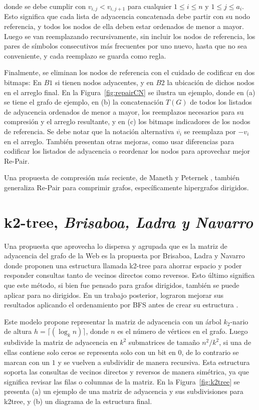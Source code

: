 \noindent donde se debe cumplir con $v_{i,j} < v_{i, j+1}$ para cualquier $1 \leq i \leq n$ y $1 \leq j \leq a_{i}$. Esto significa que cada lista de adyacencia concatenada debe partir con su nodo referencia, y todos los nodos de ella deben estar ordenados de menor a mayor. Luego se van reemplazando recursivamente, sin incluir los nodos de referencia, los pares de símbolos consecutivos más frecuentes por uno nuevo, hasta que no sea conveniente, y cada reemplazo se guarda como regla. 

Finalmente, se eliminan los nodos de referencia con el cuidado de codificar en dos bitmaps: En $B1$ si tienen nodos adyacentes, y en $B2$ la ubicación de dichos nodos en el arreglo final. En la Figura~\ref{fig:repairCN} se ilustra un ejemplo, donde en (a) se tiene el grafo de ejemplo, en (b) la concatenación $T(G)$ de todos los listados de adyacencia ordenados de menor a mayor, los reemplazos necesarios para su compresión y el arreglo resultante, y en (c) los bitmaps indicadores de los nodos de referencia. Se debe notar que la notación alternativa $\overline{v_{i}}$ se reemplaza por $-v_{i}$ en el arreglo. También presentan otras mejoras, como usar diferencias para codificar los listados de adyacencia o reordenar los nodos para aprovechar mejor Re-Pair.



Una propuesta de compresión más reciente, de Maneth y Peternek \cite{maneth2016compressing}, también generaliza Re-Pair para comprimir grafos, específicamente hipergrafos dirigidos.



\section{k2-tree, \textit{Brisaboa, Ladra y Navarro}}
Una propuesta que aprovecha lo dispersa y agrupada que es la matriz de adyacencia del grafo de la Web es la propuesta por Brisaboa, Ladra y Navarro \cite{brisaboa2009k} donde proponen una estructura llamada k2-tree para ahorrar espacio y poder responder consultas tanto de vecinos directos como reversos. Esto último significa que este método, si bien fue pensado para grafos dirigidos, también se puede aplicar para no dirigidos. En un trabajo posterior, lograron mejorar sus resultados aplicando el ordenamiento por BFS antes de crear su estructura \cite{brisaboa2014compact}.

Este modelo propone representar la matriz de adyacencia con un árbol $k_{2}$-nario de altura $h=\lceil(\log_k n)\rceil$, donde $n$ es el número de vértices en el grafo. Luego subdivide la matriz de adyacencia en $k^2$ submatrices de tamaño $n^{2}/k^{2}$, si una de ellas contiene solo ceros se representa solo con un bit en $0$, de lo contrario se marcan con un $1$ y se vuelven a subdividir de manera recursiva. Esta estructura soporta las consultas de vecinos directos y reversos de manera simétrica, ya que significa revisar las filas o columnas de la matriz. En la Figura~\ref{fig:k2tree} se presenta (a) un ejemplo de una matriz de adyacencia y sus subdivisiones para k2tree, y (b) un diagrama de la estructura final.


